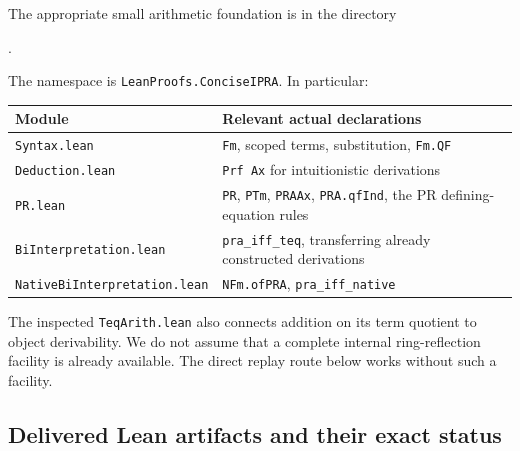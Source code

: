 \documentclass[11pt,a4paper]{article}
\theoremstyle{definition}
\newcommand{\code}[1]{\texttt{\small #1}}
\numberwithin{equation}{section}
\begin{document}
The appropriate small arithmetic foundation is in the directory
\begin{center}\small
{}.
\end{center}
The namespace is \code{LeanProofs.ConciseIPRA}. In particular:

\begin{center}
\renewcommand{\arraystretch}{1.15}
\begin{tabular}{@{}p{50mm}p{81mm}@{}}
\toprule
Module & Relevant actual declarations\\
\midrule
\code{Syntax.lean} & \code{Fm}, scoped terms, substitution, \code{Fm.QF}\\
\code{Deduction.lean} & \code{Prf Ax} for intuitionistic derivations\\
\code{PR.lean} & \code{PR}, \code{PTm}, \code{PRAAx},
\code{PRA.qfInd}, the PR defining-equation rules\\
\code{BiInterpretation.lean} & \code{pra\_iff\_teq},
transferring already constructed derivations\\
\code{NativeBiInterpretation.lean} & \code{NFm.ofPRA},
\code{pra\_iff\_native}\\
\bottomrule
\end{tabular}
\end{center}

The inspected \code{TeqArith.lean} also connects addition on its
term quotient to object derivability. We do not assume that a
complete internal ring-reflection facility is already available.
The direct replay route below works without such a facility.

\subsection{Delivered Lean artifacts and their exact status}
\end{document}
